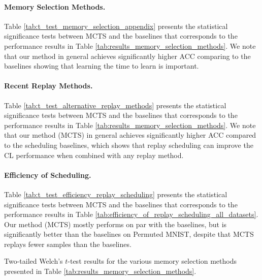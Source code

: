 \vspace{-3mm}
\paragraph{Memory Selection Methods.} Table \ref{tab:t_test_memory_selection_appendix} presents the statistical significance tests between MCTS and the baselines that corresponds to the performance results in Table \ref{tab:results_memory_selection_methods}. We note that our method in general achieves significantly higher ACC comparing to the baselines showing that learning the time to learn is important.



\vspace{-3mm}
\paragraph{Recent Replay Methods.} Table \ref{tab:t_test_alternative_replay_methods} presents the statistical significance tests between MCTS and the baselines that corresponds to the performance results in Table \ref{tab:results_memory_selection_methods}. We note that our method (MCTS) in general achieves significantly higher ACC compared to the scheduling baselines, which shows that replay scheduling can improve the CL performance when combined with any replay method. 


\vspace{-3mm}
\paragraph{Efficiency of Scheduling.} Table \ref{tab:t_test_efficiency_replay_scheduling} presents the statistical significance tests between MCTS and the baselines that corresponds to the performance results in Table \ref{tab:efficiency_of_replay_scheduling_all_datasets}. Our method (MCTS) mostly performs on par with the baselines, but is significantly better than the baselines on Permuted MNIST, despite that MCTS replays fewer samples than the baselines.




\begin{table}[t]
	\centering
	\caption{Two-tailed Welch's $t$-test results for the various memory selection methods presented in Table \ref{tab:results_memory_selection_methods}. 
	}
	\vspace{-3mm}
	\resizebox{0.98\textwidth}{!}{
		
	}
	\vspace{-3mm}
	\label{tab:t_test_memory_selection_appendix}
\end{table}


